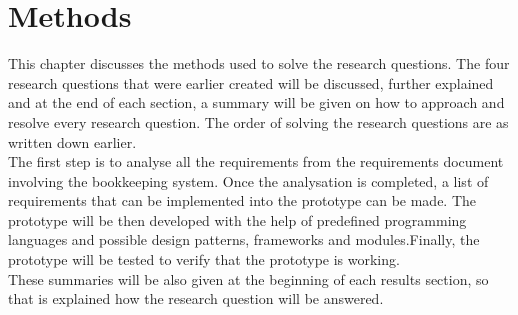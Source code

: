 \documentclass[paper=a4, fontsize=11pt,twoside]{scrartcl}	%
\begin{document}

\newpage


\section{Methods}
This chapter discusses the methods used to solve the research questions. The four research questions that were earlier created will be discussed, further explained and at the end of each section, a summary will be given on how to approach and resolve every research question. The order of solving the research questions are as written down earlier.\\
The first step is to analyse all the requirements from the requirements document involving the bookkeeping system. Once the analysation is completed,  a list of requirements that can be implemented into the prototype can be made. The prototype will be then developed with the help of predefined programming languages and possible design patterns, frameworks and modules.Finally, the prototype will be tested to verify that the prototype is working. \\
These summaries will be also given at the beginning of each results section, so that is explained how the research question will be answered.

\newpage
\end{document}
